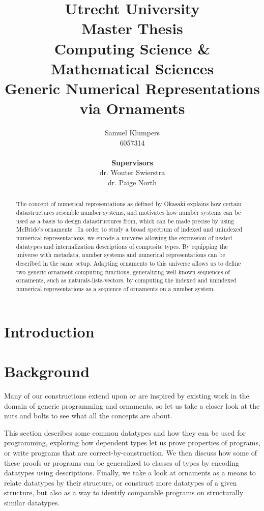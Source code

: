 \documentclass[10pt]{article}
\title{\large Utrecht University \\ Master Thesis \\ Computing Science \& Mathematical Sciences \\ \Large Generic Numerical Representations via Ornaments}
\author{Samuel Klumpers\\6057314\\ \\ \textbf{Supervisors} \\ dr. Wouter Swierstra \\ dr. Paige North}
\theoremstyle{plain}
\theoremstyle{definition}
\begin{document}
\maketitle

\newpage
\begin{abstract}
The concept of numerical representations as defined by Okasaki \cite{purelyfunctional} explains how certain datastructures resemble number systems, and motivates how number systems can be used as a basis to design datastructures from, which can be made precise by using McBride's ornaments \cite{algorn}. In order to study a broad spectrum of indexed and unindexed numerical representations, we encode a universe allowing the expression of nested datatypes and internalization descriptions of composite types. By equipping the universe with metadata, number systems and numerical representations can be described in the same setup. Adapting ornaments to this universe allows us to define two generic ornament computing functions, generalizing well-known sequences of ornaments, such as naturals-lists-vectors, by computing the indexed and unindexed numerical representations as a sequence of ornaments on a number system.
\end{abstract}


\newpage
\tableofcontents
\listoftodos
\newpage

\section{Introduction}\label{sec:introduction}



\section{Background}\label{part:background}
Many of our constructions extend upon or are inspired by existing work in the domain of generic programming and ornaments, so let us take a closer look at the nuts and bolts to see what all the concepts are about.

This section describes some common datatypes and how they can be used for programming, exploring how dependent types let us prove properties of programs, or write programs that are correct-by-construction. We then discuss how some of these proofs or programs can be generalized to classes of types by encoding datatypes using descriptions. Finally, we take a look at ornaments as a means to relate datatypes by their structure, or construct more datatypes of a given structure, but also as a way to identify comparable programs on structurally similar datatypes.
\end{document}
